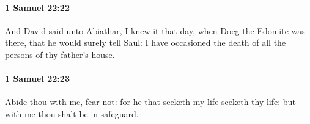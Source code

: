 		\paragraph{1 Samuel 22:22} %
			\label{1SAMUEL-22-22}

			And David said unto Abiathar, I knew it that day, when Doeg the Edomite was there, that he would surely tell Saul: I have occasioned the death of all the persons of thy father’s house.


		\paragraph{1 Samuel 22:23} %
			\label{1SAMUEL-22-23}

			Abide thou with me, fear not: for he that seeketh my life seeketh thy life: but with me thou shalt be in safeguard.

